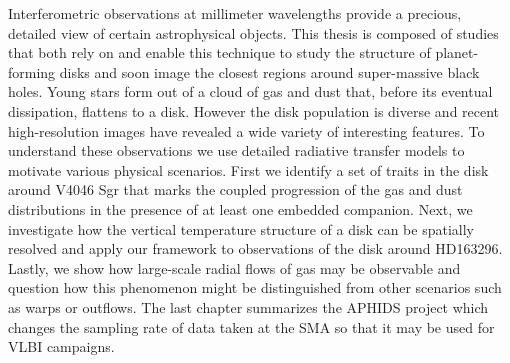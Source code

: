 
Interferometric observations at millimeter wavelengths provide a precious, detailed view 
of certain astrophysical objects.  This thesis is composed of studies that both rely on and enable this 
technique to study the structure of planet-forming disks and soon image the closest regions around 
super-massive black holes.  Young stars form out of a cloud of gas and dust that, before its eventual dissipation,
flattens to a disk.  However the disk population is diverse and recent high-resolution images have 
revealed a wide variety of interesting features.  To understand these observations we use detailed radiative 
transfer models to motivate various physical scenarios.  First we identify a set of traits in the disk around
V4046 Sgr that marks the coupled progression of the gas and dust distributions in the presence of at least one
embedded companion.  Next, we investigate how the vertical temperature structure of a disk can be spatially 
resolved and apply our framework to observations of the disk around HD163296.  Lastly, we show how large-scale
radial flows of gas may be observable and question how this phenomenon might be distinguished from other 
scenarios such as warps or outflows.  The last chapter summarizes the APHIDS project which changes the sampling 
rate of data taken at the SMA so that it may be used for VLBI campaigns.
